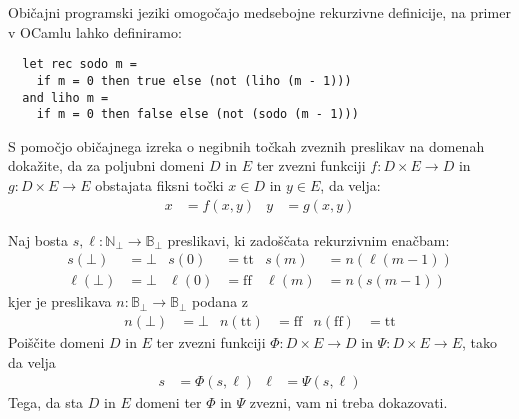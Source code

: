 \documentclass[arhiv]{izpit}
\begin{document}

\naloga[\tocke{25}]
Običajni programski jeziki omogočajo medsebojne rekurzivne definicije, na primer v OCamlu lahko definiramo:
\begin{verbatim}
  let rec sodo m =
    if m = 0 then true else (not (liho (m - 1)))
  and liho m =
    if m = 0 then false else (not (sodo (m - 1)))
\end{verbatim}

\podnaloga
S pomočjo običajnega izreka o negibnih točkah zveznih preslikav na domenah dokažite, da za poljubni domeni $D$ in $E$ ter zvezni funkciji $f \colon D \times E \to D$ in $g \colon D \times E \to E$ obstajata fiksni točki $x \in D$ in $y \in E$, da velja:
\begin{align*}
  x &= f(x, y) &
  y &= g(x, y)
\end{align*}
\prostor

\podnaloga
Naj bosta $s, \ell \colon \mathbb{N}_\bot \to \mathbb{B}_\bot$ preslikavi, ki zadoščata rekurzivnim enačbam:
\begin{align*}
  s(\bot) &= \bot &
  s(0) &= \mathrm{tt} &
  s(m) &= n (\ell(m - 1)) \\
  \ell(\bot) &= \bot &
  \ell(0) &= \mathrm{ff} &
  \ell(m) &= n (s(m - 1))
\end{align*}
kjer je preslikava $n \colon \mathbb{B}_\bot \to \mathbb{B}_\bot$ podana z
\begin{align*}
  n(\bot) &= \bot &
  n(\mathrm{tt}) &= \mathrm{ff} &
  n(\mathrm{ff}) &= \mathrm{tt}
\end{align*}
Poiščite domeni $D$ in $E$ ter zvezni funkciji $\Phi \colon D \times E \to D$ in $\Psi \colon D \times E \to E$, tako da velja
\begin{align*}
  s &= \Phi(s, \ell) &
  \ell &= \Psi(s, \ell)
\end{align*}
Tega, da sta $D$ in $E$ domeni ter $\Phi$ in $\Psi$ zvezni, vam ni treba dokazovati.
\prostor
\end{document}
